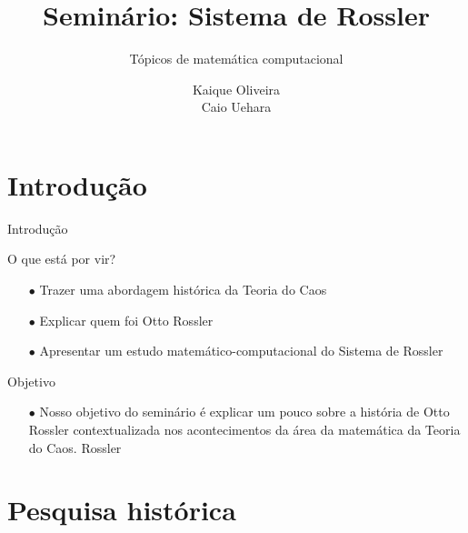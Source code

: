 \documentclass{beamer}
\title{Seminário: Sistema de Rossler}
\subtitle{Tópicos de matemática computacional}
\author[]{Kaique Oliveira \\ Caio Uehara}
\begin{document}
	\typesetFrontSlides



\section{Introdução}


\begin{frame}{Introdução}

    \begin{exampleblock}{O que está por vir?}
    	\begin{itemize}
    	\item [$\bullet$] Trazer uma abordagem histórica da Teoria do Caos
		\item [$\bullet$] Explicar quem foi Otto Rossler
		\item [$\bullet$] Apresentar um estudo matemático-computacional do Sistema de 	Rossler 
		\end{itemize}
    \end{exampleblock}
    
        \begin{exampleblock}{Objetivo}
    	\begin{itemize}
		\item [$\bullet$] Nosso objetivo do seminário é explicar um pouco sobre a história de Otto Rossler contextualizada nos acontecimentos da área da matemática da Teoria do Caos.
	Rossler 
    	\end{itemize}
    \end{exampleblock}
    
\end{frame}



\section{Pesquisa histórica}
\end{document}
